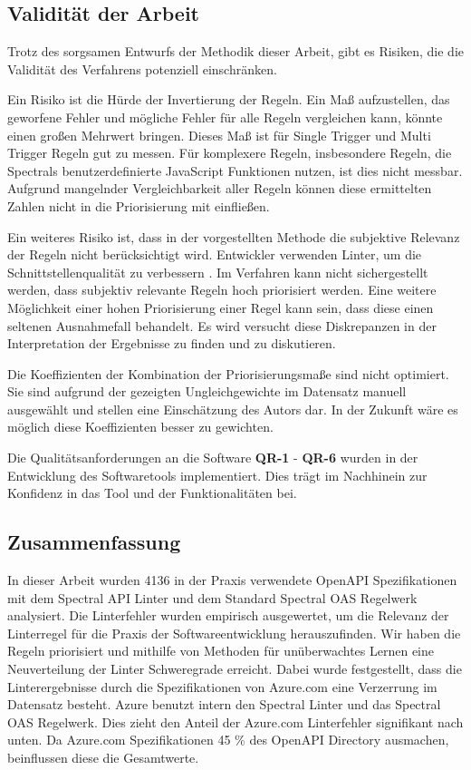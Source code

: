 \subsection{Validität der Arbeit} \label{sec:validitätdesverfahrens}
  Trotz des sorgsamen Entwurfs der Methodik dieser Arbeit, gibt es Risiken, die die Validität des Verfahrens potenziell einschränken.

  Ein Risiko ist die Hürde der Invertierung der Regeln. Ein Maß aufzustellen, das geworfene Fehler und mögliche Fehler für alle Regeln vergleichen kann, könnte einen großen Mehrwert bringen. Dieses Maß ist für Single Trigger und Multi Trigger Regeln gut zu messen. Für komplexere Regeln, insbesondere Regeln, die Spectrals benutzerdefinierte JavaScript Funktionen nutzen, ist dies nicht messbar. Aufgrund mangelnder Vergleichbarkeit aller Regeln können diese ermittelten Zahlen nicht in die Priorisierung mit einfließen.

  Ein weiteres Risiko ist, dass in der vorgestellten Methode die subjektive Relevanz der Regeln nicht berücksichtigt wird. Entwickler verwenden Linter, um die Schnittstellenqualität zu verbessern \parencite{tomasdottir_adoption_2018}. Im Verfahren kann nicht sichergestellt werden, dass subjektiv relevante Regeln hoch priorisiert werden. Eine weitere Möglichkeit einer hohen Priorisierung einer Regel kann sein, dass diese einen seltenen Ausnahmefall behandelt. Es wird versucht diese Diskrepanzen in der Interpretation der Ergebnisse zu finden und zu diskutieren.

  Die Koeffizienten der Kombination der Priorisierungsmaße sind nicht optimiert. Sie sind aufgrund der gezeigten Ungleichgewichte im Datensatz manuell ausgewählt und stellen eine Einschätzung des Autors dar. In der Zukunft wäre es möglich diese Koeffizienten besser zu gewichten.

  Die Qualitätsanforderungen an die Software \textbf{QR-1} - \textbf{QR-6} wurden in der Entwicklung des Softwaretools implementiert. Dies trägt im Nachhinein zur Konfidenz in das Tool und der Funktionalitäten bei.

\subsection{Zusammenfassung} \label{sec:zusammenfassung}
  In dieser Arbeit wurden 4136 in der Praxis verwendete OpenAPI Spezifikationen mit dem Spectral API Linter und dem Standard Spectral OAS Regelwerk analysiert. Die Linterfehler wurden empirisch ausgewertet, um die Relevanz der Linterregel für die Praxis der Softwareentwicklung herauszufinden. Wir haben die Regeln priorisiert und mithilfe von Methoden für unüberwachtes Lernen eine Neuverteilung der Linter Schweregrade erreicht. Dabei wurde festgestellt, dass die Linterergebnisse durch die Spezifikationen von Azure.com eine Verzerrung im Datensatz besteht. Azure benutzt intern den Spectral Linter und das Spectral \acs{OAS} Regelwerk. Dies zieht den Anteil der Azure.com Linterfehler signifikant nach unten. Da Azure.com Spezifikationen 45 \% des OpenAPI Directory ausmachen, beinflussen diese die Gesamtwerte. 
  
